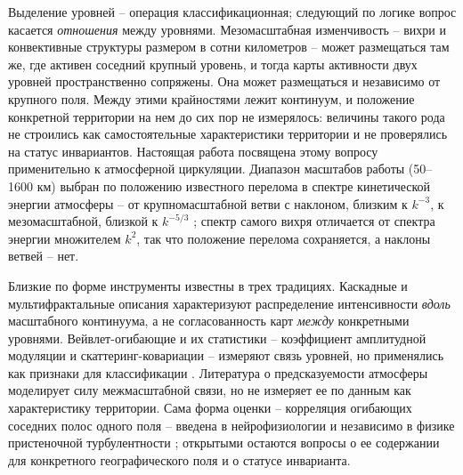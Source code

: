 \documentclass[12pt,a4paper]{article}
\begin{document}
Выделение уровней -- операция классификационная; следующий по логике вопрос касается \emph{отношения} между уровнями. Мезомасштабная изменчивость -- вихри и конвективные структуры размером в сотни километров -- может размещаться там же, где активен соседний крупный уровень, и тогда карты активности двух уровней пространственно сопряжены. Она может размещаться и независимо от крупного поля. Между этими крайностями лежит континуум, и положение конкретной территории на нем до сих пор не измерялось: величины такого рода не строились как самостоятельные характеристики территории и не проверялись на статус инвариантов. Настоящая работа посвящена этому вопросу применительно к атмосферной циркуляции. Диапазон масштабов работы (50--1600 км) выбран по положению известного перелома в спектре кинетической энергии атмосферы -- от крупномасштабной ветви с наклоном, близким к $k^{-3}$, к мезомасштабной, близкой к $k^{-5/3}$ \cite{NastromGage1985}; спектр самого вихря отличается от спектра энергии множителем $k^{2}$, так что положение перелома сохраняется, а наклоны ветвей -- нет.

Близкие по форме инструменты известны в трех традициях. Каскадные и мультифрактальные описания \cite{LovejoySchertzer2013,Lovejoy2011,Kouhen2024} характеризуют распределение интенсивности \emph{вдоль} масштабного континуума, а не согласованность карт \emph{между} конкретными уровнями. Вейвлет-огибающие и их статистики -- коэффициент амплитудной модуляции \cite{Farge1992,Mathis2009} и скаттеринг-ковариации \cite{Mallat2012,BrunaMallat2013,Cheng2024} -- измеряют связь уровней, но применялись как признаки для классификации \cite{Skinner2025}. Литература о предсказуемости атмосферы \cite{Lorenz1969,Zhang2007,RotunnoSnyder2008,Judt2020,SelzCraig2023} моделирует силу межмасштабной связи, но не измеряет ее по данным как характеристику территории. Сама форма оценки -- корреляция огибающих соседних полос одного поля -- введена в нейрофизиологии \cite{Bruns2000,Canolty2006} и независимо в физике пристеночной турбулентности \cite{Mathis2009}; открытыми остаются вопросы о ее содержании для конкретного географического поля и о статусе инварианта.
\end{document}
